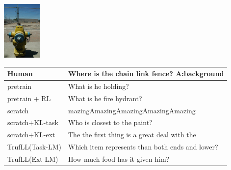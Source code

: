 \documentclass{article}
\newcommand{\algo}{TrufLL\xspace}
\begin{document}
\begin{table}[t!]
    \begin{minipage}{0.2\linewidth}
        \includegraphics[height= 110px]{./COCO_val2014_000000216083.jpeg}
	\end{minipage}
	\hfill
	\begin{minipage}{0.80\linewidth}
		\scriptsize
		\begin{tabular}{ll}
			Human           & Where is the chain link fence?  \quad \textbf{A:background} \\
			\midrule
			pretrain        & What is he holding? \\
		    pretrain + RL   & What is he fire hydrant? \\ \midrule
			scratch         & mazingAmazingAmazingAmazingAmazing  \\
			scratch+KL-task & Who is closest to the paint? \\
			scratch+KL-ext  & The the first thing is a great deal with the\\ \midrule
			\algo(Task-LM) & Which item represents than both ends and lower? \\
			\algo(Ext-LM)   & How much food has it given him? \\
			\bottomrule
		\end{tabular}
	\end{minipage}
	\vspace{1mm}
	

\end{table}
\end{document}
